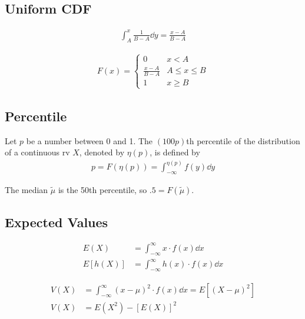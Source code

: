 \documentclass[paper=A4, pagesize, fontsize=7pt, DIV=calc]{scrartcl}
\begin{document}
\begin{minipage}[t]{.45\linewidth}
  \subsection{Uniform CDF}
  \begin{minipage}{.5\linewidth}
    \begin{align*}
      \int_{A}^{x} \frac{1}{B - A} \dd{y} = \frac{x - A}{B - A}
    \end{align*}
  \end{minipage}%
  \begin{minipage}{.5\linewidth}
    \begin{align*}
      F(x) = \begin{cases}
        0                   & x < A \\
        \frac{x - A}{B - A} & A \le x \le B \\
        1                   & x \ge B
      \end{cases}
    \end{align*}
  \end{minipage}

  \subsection{Percentile}
  Let $p$ be a number between 0 and 1. The $(100p)$th percentile of the distribution of a continuous rv $X$, denoted by $\eta(p)$, is defined by
  \begin{align*}
    p = F(\eta(p)) = \int_{-\infty}^{\eta(p)} f(y) \dd{y}
  \end{align*}

  The median $\tilde{\mu}$ is the 50th percentile, so $.5 = F(\tilde{\mu})$.

  \subsection{Expected Values}
  \begin{minipage}{.5\linewidth}
    \begin{align*}
      E(X) &= \int_{-\infty}^{\infty} x \cdot f(x) \dd{x} \\
      E[h(X)] &= \int_{-\infty}^{\infty} h(x) \cdot f(x) \dd{x}
    \end{align*}
  \end{minipage}%
  \begin{minipage}{.5\linewidth}
    \begin{align*}
      V(X) &= \int_{-\infty}^{\infty} (x - \mu)^2 \cdot f(x) \dd{x} = E[(X - \mu)^2] \\
      V(X) &= E(X^2) - [E(X)]^2
    \end{align*}
  \end{minipage}


\end{minipage}
\end{document}
